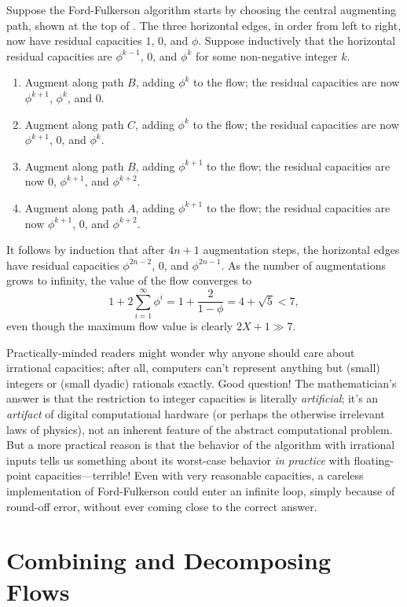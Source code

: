 Suppose the Ford-Fulkerson algorithm starts by choosing the central augmenting path, shown at the top of .
The three horizontal edges, in order from left to right, now have residual capacities $1$, $0$, and $\phi$.
Suppose inductively that the horizontal residual capacities are $\phi^{k-1}$, $0$, and $\phi^k$ for some non-negative integer $k$.
\begin{enumerate}
\item Augment along path $B$, adding $\phi^k$ to the flow; the residual capacities are now $\phi^{k+1}$, $\phi^k$, and $0$.
\item Augment along path $C$, adding $\phi^k$ to the flow; the residual capacities are now $\phi^{k+1}$, $0$, and $\phi^k$.
\item Augment along path $B$, adding $\phi^{k+1}$ to the flow; the residual capacities are now $0$, $\phi^{k+1}$, and $\phi^{k+2}$.
\item Augment along path $A$, adding $\phi^{k+1}$ to the flow; the residual capacities are now $\phi^{k+1}$, $0$, and $\phi^{k+2}$.
\end{enumerate}
\noindent It follows by induction that after $4n+1$ augmentation steps, the horizontal edges have residual capacities $\phi^{2n-2}$, $0$, and $\phi^{2n-1}$.
As the number of augmentations grows to infinity, the value of the flow converges to
\[
1 + 2\sum_{i=1}^{\infty} \phi^i = 1 + \frac{2}{1-\phi} = 4 + \sqrt{5} < 7,
\]
even though the maximum flow value is clearly $2X + 1 \gg 7$.

Practically-minded readers might wonder why anyone should care about irrational capacities; after all, computers can’t represent anything but (small) integers or (small dyadic) rationals exactly. Good question! The mathematician’s answer is that the restriction to integer capacities is literally \textit{artificial}; it’s an \textit{artifact} of digital computational hardware (or perhaps the otherwise irrelevant laws of physics), not an inherent feature of the abstract computational problem. But a more practical reason is that the behavior of the algorithm with irrational inputs tells us something about its worst-case behavior \textit{in practice} with floating-point capacities---terrible! Even with very reasonable capacities, a careless implementation of Ford-Fulkerson could enter an infinite loop, simply because of round-off error, without ever coming close to the correct answer.

\section{Combining and Decomposing Flows}
\label{sec:10.5}

